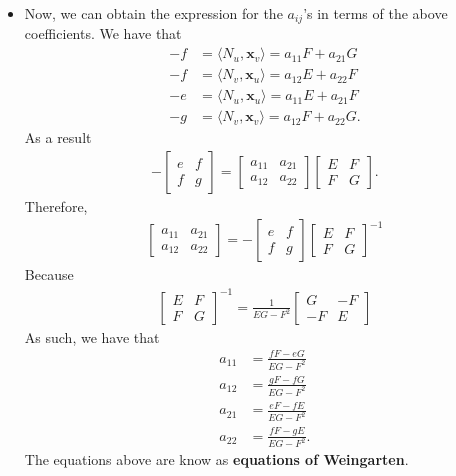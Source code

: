 \documentclass[10pt]{article}
\newcommand{\ve}[1]{\mathbf{#1}}
\begin{document}
\begin{itemize}
    \item Now, we can obtain the expression for the $a_{ij}$'s in terms of the above coefficients. We have that
    \begin{align*}
      -f &= \langle N_u, \ve{x}_v \rangle = a_{11}F + a_{21}G\\
      -f &= \langle N_v, \ve{x}_u \rangle = a_{12}E + a_{22}F\\
      -e &= \langle N_u, \ve{x}_u \rangle = a_{11}E + a_{21}F\\
      -g &= \langle N_v, \ve{x}_v \rangle = a_{12}F + a_{22}G.
    \end{align*}
    As a result
    \begin{align*}
      - \begin{bmatrix}
        e & f\\
        f & g
      \end{bmatrix}
      =
      \begin{bmatrix}
        a_{11} & a_{21}\\
        a_{12} & a_{22}
      \end{bmatrix}
      \begin{bmatrix}
        E & F\\
        F & G
      \end{bmatrix}.    
    \end{align*}
    Therefore,
    \begin{align*}
      \begin{bmatrix}
        a_{11} & a_{21}\\
        a_{12} & a_{22}
      \end{bmatrix}
      =
      - \begin{bmatrix}
        e & f\\
        f & g
      \end{bmatrix}
      \begin{bmatrix}
        E & F\\
        F & G
      \end{bmatrix}^{-1}
    \end{align*}
    Because
    \begin{align*}
      \begin{bmatrix}
        E & F\\
        F & G
      \end{bmatrix}^{-1}
      =
      \frac{1}{EG-F^2}
      \begin{bmatrix}
        G & -F\\
        -F & E
      \end{bmatrix}
    \end{align*}
    As such, we have that
    \begin{align*}
      a_{11} &= \frac{fF-eG}{EG-F^2}\\
      a_{12} &= \frac{gF-fG}{EG-F^2}\\
      a_{21} &= \frac{eF-fE}{EG-F^2}\\
      a_{22} &= \frac{fF-gE}{EG-F^2}.
    \end{align*}
    The equations above are know as {\bf equations of Weingarten}.


\end{itemize}
\end{document}
